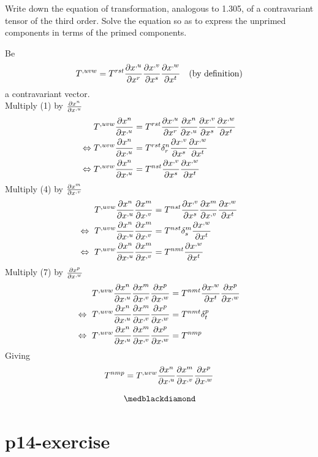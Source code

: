 \begin{tcolorbox}
Write down the equation of transformation, analogous to 1.305, of a contravariant tensor of the third order. Solve the equation so as to express the unprimed components in terms of the primed components.

\end{tcolorbox}
Be 
\begin{align}
T^{,uvw}=T^{rst} \pdv{x^{,u}}{x^r}\pdv{x^{,v}}{x^s}\pdv{x^{,w}}{x^t}\quad\text{(by definition)}
\end{align}
a contravariant vector.\\
Multiply (1) by $\pdv{x^{n}}{x^{,u}}$
\begin{align}
\ T^{,uvw}\pdv{x^{n}}{x^{,u}}&= T^{rst} \pdv{x^{,u}}{x^r}\pdv{x^{n}}{x^{,u}}\pdv{x^{,v}}{x^s}\pdv{x^{,w}}{x^t}\\
\Leftrightarrow  T^{,uvw}\pdv{x^{n}}{x^{,u}}&= T^{rst} \delta^{n}_{r}\pdv{x^{,v}}{x^s}\pdv{x^{,w}}{x^t}\\
\Leftrightarrow  T^{,uvw}\pdv{x^{n}}{x^{,u}}&= T^{nst} \pdv{x^{,v}}{x^s}\pdv{x^{,w}}{x^t}
\end{align}
Multiply (4) by $\pdv{x^{m}}{x^{,v}}$
\begin{align}
\ T^{,uvw}\pdv{x^{n}}{x^{,u}}\pdv{x^{m}}{x^{,v}} &= T^{nst} \pdv{x^{,v}}{x^s}\pdv{x^{m}}{x^{,v}}\pdv{x^{,w}}{x^t}\\
\Leftrightarrow  \ T^{,uvw}\pdv{x^{n}}{x^{,u}}\pdv{x^{m}}{x^{,v}} &= T^{nst} \delta_{s}^{m}\pdv{x^{,w}}{x^t}\\
\Leftrightarrow  \ T^{,uvw}\pdv{x^{n}}{x^{,u}}\pdv{x^{m}}{x^{,v}} &= T^{nmt} \pdv{x^{,w}}{x^t}
\end{align}
Multiply (7) by $\pdv{x^{p}}{x^{,w}}$
\begin{align}
\ T^{,uvw}\pdv{x^{n}}{x^{,u}}\pdv{x^{m}}{x^{,v}}\pdv{x^{p}}{x^{,w}} &= T^{nmt} \pdv{x^{,w}}{x^t}\pdv{x^{p}}{x^{,w}}\\
\Leftrightarrow \ T^{,uvw}\pdv{x^{n}}{x^{,u}}\pdv{x^{m}}{x^{,v}}\pdv{x^{p}}{x^{,w}} &= T^{nmt} \delta^{p}_{t}\\
\Leftrightarrow  \ T^{,uvw}\pdv{x^{n}}{x^{,u}}\pdv{x^{m}}{x^{,v}}\pdv{x^{p}}{x^{,w}} &= T^{nmp} 
\end{align}
Giving
$$T^{nmp} =  T^{,uvw}\pdv{x^{n}}{x^{,u}}\pdv{x^{m}}{x^{,v}}\pdv{x^{p}}{x^{,w}} $$

$$\medblackdiamond$$
\pagebreak[4]

\section{p14-exercise}

